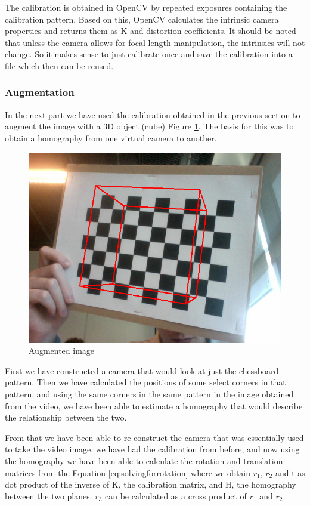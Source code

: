 The calibration is obtained in OpenCV by repeated exposures containing the calibration pattern. Based on this, OpenCV calculates the intrinsic camera properties and returns them as K and distortion coefficients. It should be noted that unless the camera allows for focal length manipulation, the intrinsics will not change. So it makes sense to just calibrate once and save the calibration into a file which then can be reused.

\subsubsection{Augmentation}

In the next part we have used the calibration obtained in the previous section to augment the image with a 3D object (cube) Figure \ref{fig:augment}. The basis for this was to obtain a homography from one virtual camera to another. 

\begin{figure}[h!]
	\centering
	\includegraphics[width=\textwidth]{final/images/augmentation1.png}
	\caption{Augmented image}
	\label{fig:augment}
\end{figure}

First we have constructed a camera that would look at just the chessboard pattern. Then we have calculated the positions of some select corners in that pattern, and using the same corners in the same pattern in the image obtained from the video, we have been able to estimate a homography that would describe the relationship between the two.

From that we have been able to re-construct the camera that was essentially used to take the video image. we have had the calibration from before, and now using the homography we have been able to calculate the rotation and translation matrices from the Equation \ref{eq:solvingforrotation} where we obtain $r_{1}$, $r_{2}$ and t as dot product of the inverse of K, the calibration matrix, and H, the homography between the two planes. $r_{3}$ can be calculated as a cross product of $r_{1}$ and $r_{2}$.

